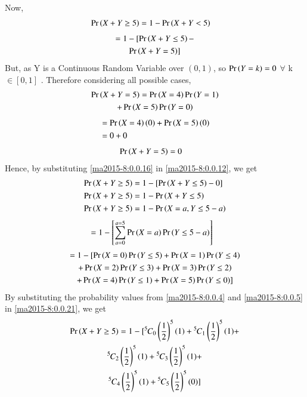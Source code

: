 Now,
\begin{align}
\Pr\left(X + Y \geq 5\right) &= 1 - \Pr\left(X + Y <  5\right)
\end{align}
\begin{multline}
= 1 - [\Pr\left(X + Y \leq 5\right) - \\ \Pr\left(X + Y = 5\right)] \label{ma2015-8:0.0.12}    
\end{multline}
But, as Y is a Continuous Random Variable over $(0,1)$, so $\Pr\left(Y = k \right) = 0$  $\forall$ k $\in [0,1]$ . Therefore considering all possible cases,
\begin{multline}
\Pr\left(X + Y = 5\right) = \Pr\left(X = 4\right)\Pr\left(Y = 1\right) \\ + \Pr\left(X = 5\right)\Pr\left(Y = 0\right)    
\end{multline}
\begin{align}
&= \Pr\left(X = 4\right)(0) + \Pr\left(X = 5\right)(0) \\
&= 0 + 0 
\end{align}
\begin{align}
\Pr\left(X + Y = 5\right) &= 0 \label{ma2015-8:0.0.16}    
\end{align}
Hence, by substituting \eqref{ma2015-8:0.0.16} in \eqref{ma2015-8:0.0.12}, we get
\begin{align}
\Pr\left(X + Y \geq 5\right) &= 1 - [\Pr\left(X + Y \leq 5\right) -  0] \\
\Pr\left(X + Y \geq 5\right) &= 1 - \Pr\left(X + Y \leq 5\right) \\
\Pr\left(X + Y \geq 5\right) &= 1 - \Pr\left(X = a, Y \leq 5 - a\right)
\end{align}
\begin{align}
&= 1 - \left[\sum_{a = 0}^{a = 5} \Pr\left(X = a\right)\Pr\left(Y \leq 5-a\right) \right]     
\end{align}
\begin{multline}
= 1 - [ \Pr\left(X = 0\right)\Pr\left(Y \leq 5\right) + \Pr\left(X = 1\right)\Pr\left(Y \leq 4\right) \\
+ \Pr\left(X = 2\right)\Pr\left(Y \leq 3\right) + \Pr\left(X = 3\right)\Pr\left(Y \leq 2\right) \\
+ \Pr\left(X = 4\right)\Pr\left(Y \leq 1\right) + \Pr\left(X = 5\right)\Pr\left(Y \leq 0\right) ] \label{ma2015-8:0.0.21}    
\end{multline}
By substituting the probability values from \eqref{ma2015-8:0.0.4} and \eqref{ma2015-8:0.0.5} in \eqref{ma2015-8:0.0.21}, we get
\begin{multline}
\Pr\left(X + Y \geq 5\right) = 1 - [{{}^{5}\mkern-1muC_{0}}\left(\frac{1}{2}\right)^{5}(1) + {{}^{5}\mkern-1muC_{1}}\left(\frac{1}{2}\right)^{5}(1) + \\ {{}^{5}\mkern-1muC_{2}}\left(\frac{1}{2}\right)^{5}(1) + 
{{}^{5}\mkern-1muC_{3}}\left(\frac{1}{2}\right)^{5}(1) + \\
{{}^{5}\mkern-1muC_{4}}\left(\frac{1}{2}\right)^{5}(1) + 
{{}^{5}\mkern-1muC_{5}}\left(\frac{1}{2}\right)^{5}(0)]  
\end{multline}
